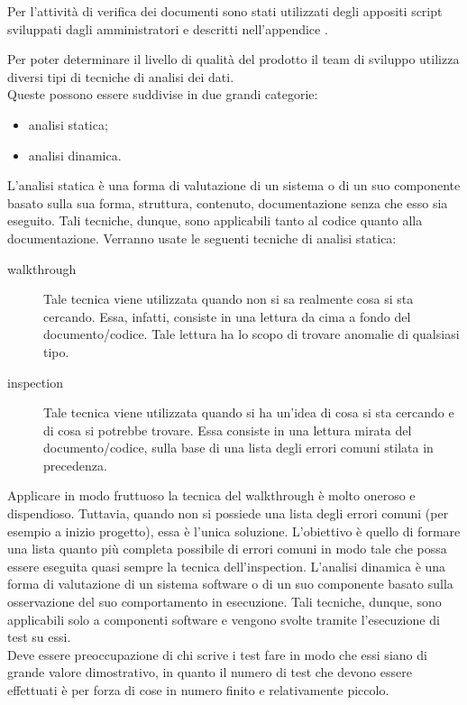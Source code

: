 	Per l'attività di verifica dei documenti sono stati utilizzati degli appositi script sviluppati dagli amministratori e descritti nell'appendice .

			Per poter determinare il livello di qualità del prodotto il team di sviluppo utilizza diversi tipi di tecniche di analisi dei dati.\\
			Queste possono essere suddivise in due grandi categorie:
			\begin{itemize}
				\item analisi statica;
				\item analisi dinamica.
			\end{itemize}
				L'analisi statica è una forma di valutazione di un sistema o di un suo componente basato sulla sua forma, struttura, contenuto, documentazione senza che esso sia eseguito. Tali tecniche, dunque, sono applicabili tanto al codice quanto alla documentazione.
				Verranno usate le seguenti tecniche di analisi statica:
				\begin{description}
					\item[walkthrough] Tale tecnica viene utilizzata quando non si sa realmente cosa si sta cercando. Essa, infatti, consiste in una lettura da cima a fondo del documento/codice. Tale lettura ha lo scopo di trovare anomalie di qualsiasi tipo.
					\item[inspection] Tale tecnica viene utilizzata quando si ha un'idea di cosa si sta cercando e di cosa si potrebbe trovare. Essa consiste in una lettura mirata del documento/codice, sulla base di una lista degli errori comuni stilata in precedenza.
				\end{description}
				Applicare in modo fruttuoso la tecnica del walkthrough è molto oneroso e dispendioso. Tuttavia, quando non si possiede una lista degli	errori comuni (per esempio a inizio progetto), essa è l'unica soluzione. L'obiettivo è quello di formare una lista quanto più completa possibile di errori comuni in modo tale che possa essere eseguita quasi sempre la tecnica dell'inspection.
				L'analisi dinamica è una forma di valutazione di un sistema software o di un suo componente basato sulla osservazione del suo comportamento in esecuzione. Tali tecniche, dunque, sono applicabili solo a componenti software e vengono svolte tramite l'esecuzione di test su essi.\\
				Deve essere preoccupazione di chi scrive i test fare in modo che essi siano di grande valore dimostrativo, in quanto il numero di test che devono essere effettuati è per forza di cose in numero finito e relativamente piccolo.
		
